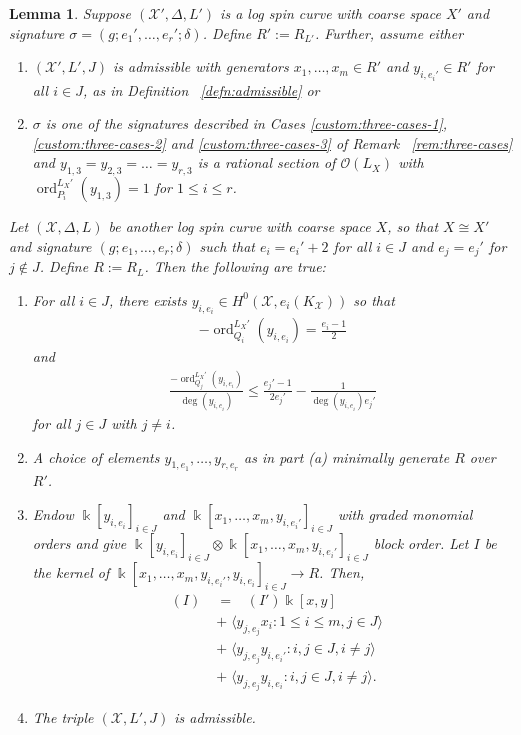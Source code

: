 \documentclass{amsart}
\theoremstyle{plain}
\newtheorem{lem}[thm]{Lemma}
\theoremstyle{definition}
\theoremstyle{remark}
\numberwithin{equation}{section}
\newcommand\Bk{{\Bbbk}}
\newcommand\sco{{\mathscr O}}
\DeclareMathOperator{\ord}{ord}
\newcommand\sx{\mathscr X}
\newcommand \subhalf[1]{\frac{{#1} - 1}{2{#1}}}
\newcommand{\halfcan}{L}
\DeclareMathOperator{\initial}{in_\prec}
\begin{document}
\begin{lem}
\label{lem:raise-stacky-order}
Suppose $(\sx', \Delta, \halfcan')$ is a log spin curve with coarse
space $X'$ and signature $\sigma = (g; e_1', \ldots, e_r'; \delta)$.  Define $R':= R_{\halfcan'}$.  Further, assume either 
\begin{enumerate}
	\item $(\sx', \halfcan', J)$ is admissible with generators $x_1,
		\ldots, x_m \in R'$ and $y_{i, e_i'} \in R' $ for all $i \in J$, as 
		in Definition ~\ref{defn:admissible} or
	\item $\sigma$ is one of the signatures described in Cases
		\ref{custom:three-cases-1}, \ref{custom:three-cases-2} and
		\ref{custom:three-cases-3} of Remark ~\ref{rem:three-cases} and
		$y_{1, 3} = y_{2,3} = \ldots= y_{r,3}$ is a rational section of
		$\sco(\halfcan_X)$ with $\ord_{P_i}^{\halfcan_X'}(y_{1,3}) = 1$
		for $1 \leq  i \leq r$.
\end{enumerate}
Let
$(\sx, \Delta, \halfcan)$ be another log spin curve
with coarse space $X$, so that $X \cong X'$ and signature $(g; e_1, \ldots, e_r;
\delta)$ such that $e_i = e_i' + 2$ for all $i \in J$ and
$e_j = e_j'$ for $j \notin J$. Define $R := R_\halfcan$.  Then the following are true:
\begin{enumerate}
	\item[(a)] For all $i \in J$, there exists $y_{i, e_i} \in
		H^0(\sx, e_i(K_\sx))$ so that
		\begin{align*}
			-\ord_{Q_i}
^{\halfcan_X'}(y_{i, e_i}) = \frac{e_i - 1}{2}
		\end{align*}
		and
		\begin{align*}
			\frac{-\ord_{Q_j}
^{\halfcan_X'}(y_{i, e_i})}{\deg (y_{i, e_i})} \leq 
\subhalf{
			e_j'} - \frac{1}{\deg(y_{i, e_i})e_j'}
		\end{align*}
		for all $j \in J$ with $j \neq i$.
	\item[(b)] A choice of elements $y_{1, e_1}, \ldots, y_{r, e_r}$ as in part (a) minimally
		generate $R$ over $R'$.
	\item[(c)] Endow $\Bk[y_{i, e_i}]_{i\in J}$ and $ \Bk[x_1, \ldots, x_m, y_{i, e_i'}]_{i\in J}$ with graded monomial orders and give 
$\Bk[y_{i, e_i}]_{i\in J} \otimes \Bk[x_1, \ldots, x_m, y_{i, e_i'}]_{i\in J}$
 block order.  Let $I$ be the kernel of $\Bk[x_1, \ldots, x_m, y_{i, e_i'}, y_{i, e_i}]_{i\in J} \to R$.
  Then,
		\begin{align*}
			\initial(I) \;	&= \; \initial(I')\Bk[x, y] \\
					&+ \; \langle y_{j, e_j}x_i  : 1\le i \le m, j\in J\rangle \\
					&+ \; \langle y_{j, e_j}y_{i, e_i'}: i,j\in J, i\ne j\rangle \\
					&+ \; \langle y_{j,e_j}y_{i,e_i}: i,j\in J, i\ne j\rangle.
		\end{align*}
	\item[(d)] The triple $(\sx, \halfcan', J)$ is admissible.
\end{enumerate}
\end{lem}
\end{document}
